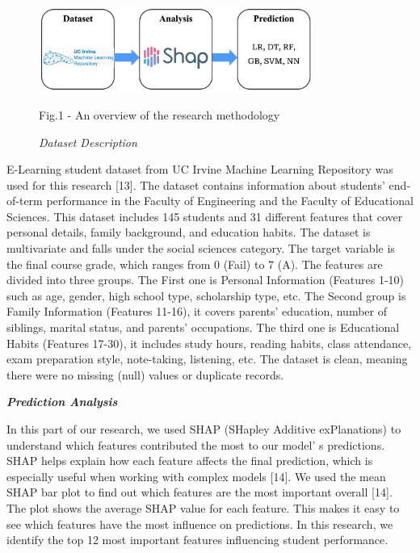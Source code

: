 \begin{figure}[H]
	\centering
	\includegraphics[width=0.8\textwidth]{media/ict/image17}
	\caption*{Fig.1 - An overview of the research methodology}
	\caption*{\emph{Dataset Description}}
\end{figure}

\begin{multicols}{2}
E-Learning student dataset from UC Irvine Machine Learning Repository
was used for this research {[}13{]}. The dataset contains information
about students'{} end-of-term performance in the Faculty
of Engineering and the Faculty of Educational Sciences. This dataset
includes 145 students and 31 different features that cover personal
details, family background, and education habits. The dataset is
multivariate and falls under the social sciences category. The target
variable is the final course grade, which ranges from 0 (Fail) to 7 (A).
The features are divided into three groups. The First one is Personal
Information (Features 1-10) such as age, gender, high school type,
scholarship type, etc. The Second group is Family Information (Features
11-16), it covers parents'{} education, number of
siblings, marital status, and parents'{} occupations. The
third one is Educational Habits (Features 17-30), it includes study
hours, reading habits, class attendance, exam preparation style,
note-taking, listening, etc. The dataset is clean, meaning there were no
missing (null) values or duplicate records.

\emph{{\bfseries Prediction Analysis}}

In this part of our research, we used SHAP (SHapley Additive
exPlanations) to understand which features contributed the most to our
model' s predictions. SHAP helps explain how each feature
affects the final prediction, which is especially useful when working
with complex models {[}14{]}. We used the mean SHAP bar plot to find out
which features are the most important overall {[}14{]}. The plot shows
the average SHAP value for each feature. This makes it easy to see which
features have the most influence on predictions. In this research, we
identify the top 12 most important features influencing student
performance.


\end{multicols}
